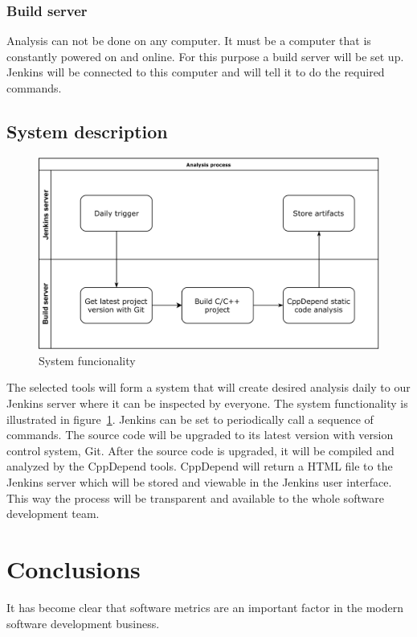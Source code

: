 \subsection{Build server}

Analysis can not be done on any computer. It must be a computer that is constantly powered on and online. For this purpose a build server will be set up. Jenkins will be connected to this computer and will tell it to do the required commands.

\section{System description}

\begin{figure}[t!]
\centering
\includegraphics[scale=0.06]{systemdesc.png}
\caption{System funcionality}
\label{fig:systemdesc}
\end{figure}

The selected tools will form a system that will create desired analysis daily to our Jenkins server where it can be inspected by everyone. The system functionality is illustrated in figure~\ref{fig:systemdesc}. Jenkins can be set to periodically call a sequence of commands. The source code will be upgraded to its latest version with version control system, Git. After the source code is upgraded, it will be compiled and analyzed by the CppDepend tools. CppDepend will return a HTML file to the Jenkins server which will be stored and viewable in the Jenkins user interface.
This way the process will be transparent and available to the whole software development team.




\chapter{Conclusions}

It has become clear that software metrics are an important factor in the modern software development business.







